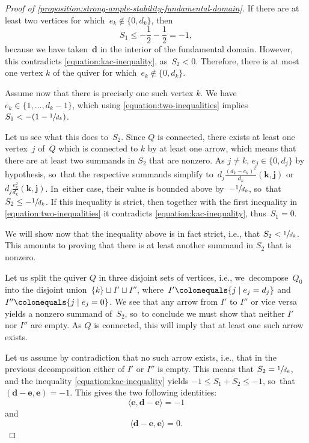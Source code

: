 \documentclass[11pt]{article}
\theoremstyle{plain}
\theoremstyle{definition}
\newcommand\tuple[1]{\ensuremath{{\boldsymbol{#1}}}}
\begin{document}
\begin{proof}[Proof of \cref{proposition:strong-ample-stability-fundamental-domain}]
If there are at least two vertices for which~$e_k\not\in \{0,d_k\}$,
then
\begin{equation*}
S_1\leq-\frac{1}{2}-\frac{1}{2}=-1,
\end{equation*}
because we have taken~$\tuple{d}$ in the interior of the fundamental domain.
However, this contradicts \eqref{equation:kac-inequality},
as~$S_2<0$.
Therefore, there is at most one vertex $k$ of the quiver
for which~$e_k \notin \{0,d_k\}$.

Assume now that there is precisely one such vertex $k$.
We have~$e_k\in\{1,\ldots,d_k-1\}$, which using \eqref{equation:two-inequalities}
implies $S_1 < -(1 - \sfrac{1}{d_k})$.

Let us see what this does to~$S_2$.
Since $Q$ is connected, there exists at least one vertex~$j$ of~$Q$
which is connected to $k$ by at least one arrow,
which means that there are at least two summands in $S_2$ that are nonzero.
As $j \neq k$, $e_j \in \{0, d_j\}$ by hypothesis, so~that the respective summands simplify to~$d_j\frac{(d_k-e_k)^2}{d_k}(\tuple{k},\tuple{j})$
or~$d_j\frac{e_k^2}{d_k}(\tuple{k},\tuple{j})$. In~either case, their value is bounded above by~$-\sfrac{1}{d_k}$, so~that~$S_2\leq-\sfrac{1}{d_k}$.
If this inequality is strict,
then together with the first inequality in \eqref{equation:two-inequalities}
it contradicts \eqref{equation:kac-inequality},
thus~$S_1=0$.

We will show now that the inequality above is in fact strict, i.e., that $S_2 < \sfrac{1}{d_k}$.
This amounts to proving that there is at least another summand in $S_2$ that is nonzero.

Let us split the quiver $Q$ in three disjoint sets of vertices,
i.e., we~decompose~$Q_0$ into
the disjoint union~$\{k\} \sqcup I' \sqcup I''$,
where~$I' \colonequals \{j \mid e_j = d_j\}$ and~$I'' \colonequals \{j \mid e_j = 0\}$.
We see that any arrow from $I'$ to $I''$ or vice versa yields a nonzero summand of~$S_2$, so~to conclude we must show that neither $I'$ nor $I''$ are empty.
As $Q$ is connected, this will imply that at least one such arrow exists.

Let us assume by contradiction that no such arrow exists, i.e.,
that in the previous decomposition either of $I'$ or $I''$ is empty.
This means that $S_2 = \sfrac{1}{d_k}$, and the inequality \eqref{equation:kac-inequality}
yields $-1 \leq S_1 + S_2 \leq -1$, so~that~$(\tuple{d} - \tuple{e}, \tuple{e}) = -1$.
This gives the two following identities:
\begin{equation}\label{equation:contradiction-1}
\langle \tuple{e}, \tuple{d} - \tuple{e} \rangle = -1
\end{equation}
and
\begin{equation}\label{equation:contradiction-2}
\langle \tuple{d} - \tuple{e}, \tuple{e} \rangle = 0.
\end{equation}


\end{proof}
\end{document}
